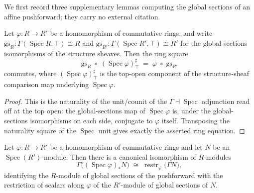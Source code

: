 We first record three supplementary lemmas computing the global sections of an
affine pushforward; they carry no external citation.

\begin{lemma}



  \label{lem:globalSectionsIso_hom_comp_specMap_appTop}
  Let \(\varphi : R \to R'\) be a homomorphism of commutative rings, and write
  \(\mathrm{gs}_R : \Gamma(\operatorname{Spec} R, \top) \cong R\) and
  \(\mathrm{gs}_{R'} : \Gamma(\operatorname{Spec} R', \top) \cong R'\) for the
  global-sections isomorphisms of the structure sheaves. Then the ring square
  \[
    \mathrm{gs}_R \;\circ\; (\operatorname{Spec}\varphi)^{\sharp}_{\top}
    \;=\; \varphi \;\circ\; \mathrm{gs}_{R'}
  \]
  commutes, where \((\operatorname{Spec}\varphi)^{\sharp}_{\top}\) is the
  top-open component of the structure-sheaf comparison map underlying
  \(\operatorname{Spec}\varphi\).
\end{lemma}

\begin{proof}



  This is the naturality of the unit/counit of the
  \(\Gamma \dashv \operatorname{Spec}\) adjunction read off at the top open: the
  global-sections map of \(\operatorname{Spec}\varphi\) is, under the
  global-sections isomorphisms on each side, conjugate to \(\varphi\) itself.
  Transposing the naturality square of the \(\operatorname{Spec}\) unit gives
  exactly the asserted ring equation.
\end{proof}

\begin{lemma}



  \label{lem:gammaPushforwardIso}
  Let \(\varphi : R \to R'\) be a homomorphism of commutative rings and let
  \(N\) be an \(\operatorname{Spec}(R')\)-module. Then there is a canonical
  isomorphism of \(R\)-modules
  \[
    \Gamma\bigl((\operatorname{Spec}\varphi)_* N\bigr)
    \;\cong\;
    \operatorname{restr}_\varphi\bigl(\Gamma N\bigr),
  \]
  identifying the \(R\)-module of global sections of the pushforward with the
  restriction of scalars along \(\varphi\) of the \(R'\)-module of global sections
  of \(N\).
\end{lemma}

